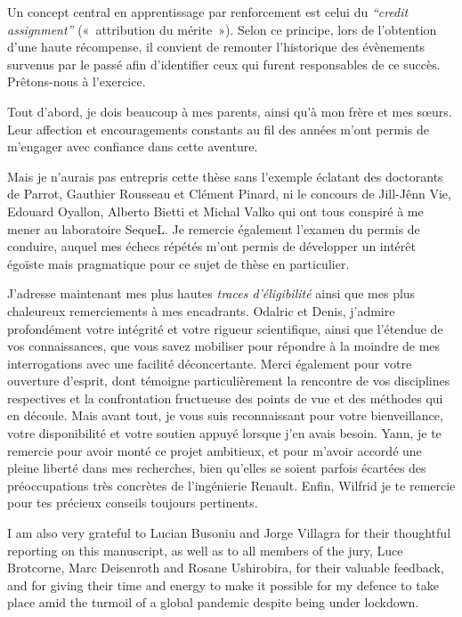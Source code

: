 
\begin{acknowledgements}
Un concept central en apprentissage par renforcement est celui du \emph{``credit assignment''} («~attribution du mérite~»). Selon ce principe, lors de l'obtention d'une haute récompense, il convient de remonter l'historique des évènements survenus par le passé afin d'identifier ceux qui furent responsables de ce succès.
Prêtons-nous à l'exercice.

Tout d'abord, je dois beaucoup à mes parents, ainsi qu'à mon frère et mes sœurs. Leur affection et encouragements constants au fil des années m'ont permis de m'engager avec confiance dans cette aventure.

Mais je n'aurais pas entrepris cette thèse sans l'exemple éclatant des doctorants de Parrot, Gauthier Rousseau et Clément Pinard, ni le concours de Jill-Jênn Vie, Edouard Oyallon, Alberto Bietti et Michal Valko qui ont tous conspiré à me mener au laboratoire SequeL. Je remercie également l'examen du permis de conduire, auquel mes échecs répétés m'ont permis de développer un intérêt égoïste mais pragmatique pour ce sujet de thèse en particulier.

J'adresse maintenant mes plus hautes \emph{traces d'éligibilité} ainsi que mes plus chaleureux remerciements à mes encadrants. Odalric et Denis, j'admire profondément votre intégrité et votre rigueur scientifique, ainsi que l'étendue de vos connaissances, que vous savez mobiliser pour répondre à la moindre de mes interrogations avec une facilité déconcertante. Merci également pour votre ouverture d'esprit, dont témoigne particulièrement la rencontre de vos disciplines respectives et la confrontation fructueuse des points de vue et des méthodes qui en découle. Mais avant tout, je vous suis reconnaissant pour votre bienveillance, votre disponibilité et votre soutien appuyé lorsque j'en avais besoin.
Yann, je te remercie pour avoir monté ce projet ambitieux, et pour m'avoir accordé une pleine liberté dans mes recherches, bien qu'elles se soient parfois écartées des préoccupations très concrètes de l'ingénierie Renault. Enfin, Wilfrid je te remercie pour tes précieux conseils toujours pertinents.

I am also very grateful to Lucian Busoniu and Jorge Villagra for their thoughtful reporting on this manuscript, as well as to all members of the jury, Luce Brotcorne, Marc Deisenroth and Rosane Ushirobira, for their valuable feedback, and for giving their time and energy to make it possible for my defence to take place amid the turmoil of a global pandemic despite being under lockdown.


\end{acknowledgements}
